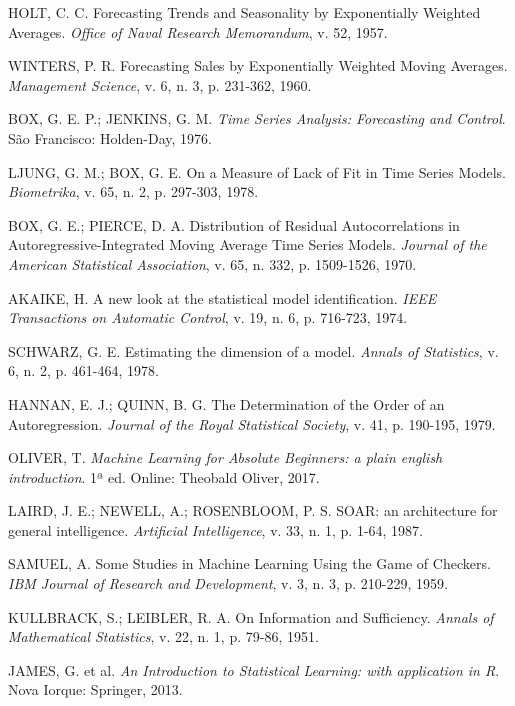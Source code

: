 \documentclass[twocolumn]{rbef}
\newcommand{\1}{\mathbbm{1}}
\begin{document}
\begin{thebibliography}{99}
 HOLT, C. C. Forecasting Trends and Seasonality by Exponentially Weighted Averages. \textit{Office of Naval Research Memorandum}, v. 52, 1957.

 WINTERS, P. R. Forecasting Sales by Exponentially Weighted Moving Averages. \textit{Management Science}, v. 6, n. 3, p. 231-362, 1960.

 BOX, G. E. P.; JENKINS, G. M. \textit{Time Series Analysis: Forecasting and Control}. São Francisco: Holden-Day, 1976.

 LJUNG, G. M.; BOX, G. E. On a Measure of Lack of Fit in Time Series Models. \textit{Biometrika}, v. 65, n. 2, p. 297-303, 1978.

 BOX, G. E.; PIERCE, D. A. Distribution of Residual Autocorrelations in Autoregressive-Integrated Moving Average Time Series Models. \textit{Journal of the American Statistical Association}, v. 65, n. 332, p. 1509-1526, 1970.

 AKAIKE, H. A new look at the statistical model identification. \textit{IEEE Transactions on Automatic Control}, v. 19, n. 6, p. 716-723, 1974.

 SCHWARZ, G. E. Estimating the dimension of a model. \textit{Annals of Statistics}, v. 6, n. 2, p. 461-464, 1978.

 HANNAN, E. J.; QUINN, B. G. The Determination of the Order of an Autoregression. \textit{Journal of the Royal Statistical Society}, v. 41, p. 190-195, 1979.

 OLIVER, T. \textit{Machine Learning for Absolute Beginners: a plain english introduction}. 1ª ed. Online: Theobald Oliver, 2017.

 LAIRD, J. E.; NEWELL, A.; ROSENBLOOM, P. S. SOAR: an architecture for general intelligence. \textit{Artificial Intelligence}, v. 33, n. 1, p. 1-64, 1987.

 SAMUEL, A. Some Studies in Machine Learning Using the Game of Checkers. \textit{IBM Journal of Research and Development}, v. 3, n. 3, p. 210-229, 1959.

 KULLBRACK, S.; LEIBLER, R. A. On Information and Sufficiency. \textit{Annals of Mathematical Statistics}, v. 22, n. 1, p. 79-86, 1951.

 JAMES, G. et al. \textit{An Introduction to Statistical Learning: with application in R}. Nova Iorque: Springer, 2013.


\end{thebibliography}
\end{document}

